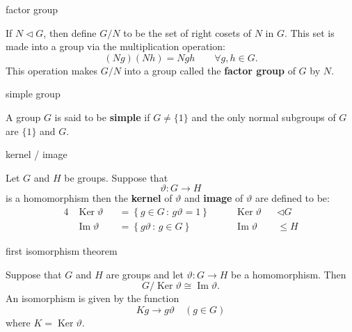 \documentclass[avery5371,grid]{flashcards}
\renewcommand{\le}{\leqslant}
\renewcommand{\theta}{\vartheta}
\newcommand{\iso}{\cong}
\newcommand{\set}[2]{\ensuremath{\left\{ #1 \, : \, #2 \right\}}}
\newcommand{\normal}{\ensuremath{\lhd}}
\DeclareMathOperator{\Ker}{\ensuremath{\textrm{Ker}}}
\DeclareMathOperator{\Img}{\ensuremath{\textrm{Im}}}
\newcommand{\defn}[1]{\textbf{#1}}
\begin{document}
\begin{flashcard}[Definition]{factor group}

  If $N \normal G$, then define $G/N$ to be the set of right cosets of
  $N$ in $G$. This set is made into a group via the multiplication
  operation:
  \[
    (Ng)(Nh) = Ngh \qquad \forall g, h \in G.
  \]
  This operation makes $G/N$ into a group called the \defn{factor
    group} of $G$ by $N$.

\end{flashcard}

\begin{flashcard}[Definition]{simple group}

  A group $G$ is said to be \defn{simple} if $G \ne \{ 1 \}$ and the
  only normal subgroups of $G$ are $\{ 1 \}$ and $G$.
\end{flashcard}

\begin{flashcard}[Definition]{kernel / image}

  Let $G$ and $H$ be groups. Suppose that \[\theta : G \to H\] is a
  homomorphism then the \defn{kernel} of $\theta$ and \defn{image}
  of $\theta$ are defined to be:
  \begin{alignat*}{4}
    &\Ker \theta
    &&= \set{g \in G}{g\theta = 1} \quad
    && \Ker \theta &&\normal G \\
    &\Img \theta
    &&= \set{g\theta}{g \in G} \quad
    && \Img \theta &&\le H
  \end{alignat*}

\end{flashcard}

\begin{flashcard}[Theorem]{first isomorphism theorem}

  Suppose that $G$ and $H$ are groups and let $\theta: G \to H$ be a
  homomorphism. Then
  \[
    G / \Ker \theta \iso \Img \theta.
  \]
  An isomorphism is given by the function
  \[
    Kg \to g\theta \quad (g \in G)
  \]
  where $K = \Ker \theta$.
\end{flashcard}
\end{document}
